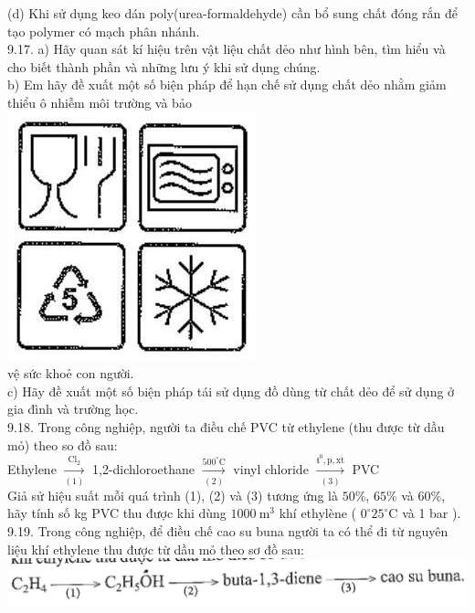 \documentclass[10pt]{article}
\begin{document}
(d) Khi sử dụng keo dán poly(urea-formaldehyde) cần bổ sung chất đóng rắn để tạo polymer có mạch phân nhánh.\\
9.17. a) Hãy quan sát kí hiệu trên vật liệu chất dẻo như hình bên, tìm hiểu và cho biết thành phần và những lưu ý khi sử dụng chúng.\\
b) Em hãy đề xuất một số biện pháp để hạn chế sử dụng chất dẻo nhằm giảm thiểu ô nhiễm môi trường và bảo\\
\includegraphics[max width=\textwidth, center]{2025_10_23_80c1361fcdcd395cad8eg-31}\\
vệ sức khoẻ con người.\\
c) Hãy đề xuất một số biện pháp tái sử dụng đồ dùng từ chất dẻo để sử dụng ở gia đình và trường học.\\
9.18. Trong công nghiệp, người ta điều chế PVC từ ethylene (thu được từ dầu mỏ) theo so đồ sau:\\
Ethylene $\xrightarrow[(1)]{\mathrm{Cl}_{2}}$ 1,2-dichloroethane $\xrightarrow[(2)]{500^{\circ} \mathrm{C}}$ vinyl chloride $\xrightarrow[(3)]{\mathfrak{t}^{0}, \mathrm{p}, \mathrm{xt}}$ PVC\\
Giả sử hiệu suất mỗi quá trình (1), (2) và (3) tương ứng là $50 \%$, $65 \%$ và $60 \%$, hãy tính số kg PVC thu được khi dùng $1000 \mathrm{~m}^{3}$ khí ethylène ( $0^{\circ} 25^{\circ} \mathrm{C}$ và 1 bar ).\\
9.19. Trong công nghiệp, để điều chế cao su buna người ta có thể đi từ nguyên liệu khí ethylene thu được từ dầu mỏ theo sơ đồ sau:\\
\includegraphics[max width=\textwidth, center]{2025_10_23_80c1361fcdcd395cad8eg-32(1)}
\end{document}
